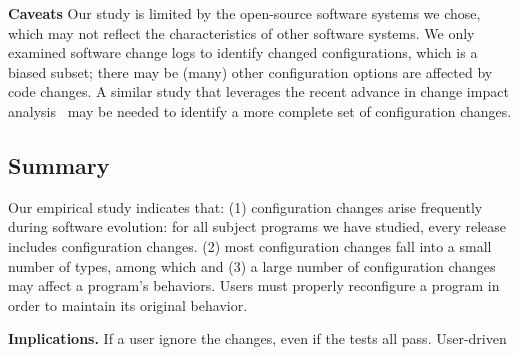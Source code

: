 

\vspace{1mm}
\noindent\textbf{Caveats}
Our study is limited by the open-source
software systems we chose, which may not reflect
the characteristics of other software systems.
We only examined software change logs to identify
changed configurations, which is a biased
subset; there may be (many) other configuration
options are affected by code changes. A similar
study that leverages the recent advance in
change impact analysis~\cite{} may be needed
to identify a more complete set of
configuration changes.



\subsection{Summary}

Our empirical study indicates that: (1) configuration
changes arise frequently during software evolution: for
all subject programs we have studied, every release
includes configuration changes. (2) most configuration
changes fall into a small number of types, among
which 
and (3) a large number of
configuration changes may affect a program's
behaviors. Users must properly reconfigure a
program in order to maintain its original behavior.



\textbf{Implications.} If a user ignore the changes, even if the tests
all pass. User-driven

